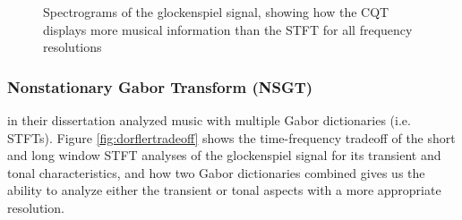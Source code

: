 \documentclass[report.tex]{subfiles}
\begin{document}
\begin{figure}[ht]
	\caption{Spectrograms of the glockenspiel signal, showing how the CQT displays more musical information than the STFT for all frequency resolutions}
	\label{fig:cqtvstft}
\end{figure}

\newpagefill

\subsubsection{Nonstationary Gabor Transform (NSGT)}
\label{sec:theorynsgt}

\textcite{doerflerphd} in their dissertation analyzed music with multiple Gabor dictionaries (i.e. STFTs). Figure \ref{fig:dorflertradeoff} shows the time-frequency tradeoff of the short and long window STFT analyses of the glockenspiel signal for its transient and tonal characteristics, and how two Gabor dictionaries combined gives us the ability to analyze either the transient or tonal aspects with a more appropriate resolution.
\end{document}
